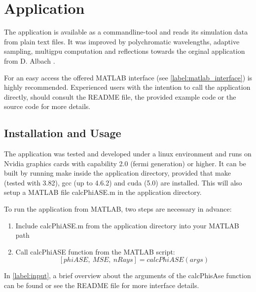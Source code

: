 \section{Application}

The application is available as a commandline-tool and reads
its simulation data from plain text files. It was improved by polychromatic
wavelengths, adaptive sampling, multigpu computation and 
reflections towards the orginal application from D. Albach \cite{ASE2010}.

For an easy access the offered MATLAB interface (see \ref{label:matlab_interface}) 
is highly recommended. Experienced users with the intention to call the application
directly, should consult the README file, the provided 
example code or the source code for more details.

\subsection{Installation and Usage}
The application was tested and developed under a linux environment
and runs on Nvidia graphics cards with capability 2.0 (fermi generation) or higher.
It can be built by running make inside the application directory, provided
that make (tested with 3.82), gcc (up to 4.6.2) and cuda (5.0) are installed. 
This will also setup a MATLAB file calcPhiASE.m in the application
directory. 

To run the application from MATLAB, two steps are
necessary in advance:
\begin{enumerate}
  \label{label:matlab_interface}
  \item Include calcPhiASE.m from the application directory into your MATLAB path
  \item Call calcPhiASE function from the MATLAB script: \[[phiASE,~MSE,~nRays] = calcPhiASE(args)\]
\end{enumerate}
In \ref{label:input}, a brief overview about the
arguments of the calcPhisAse function can be found 
or see the README file for more interface details.






